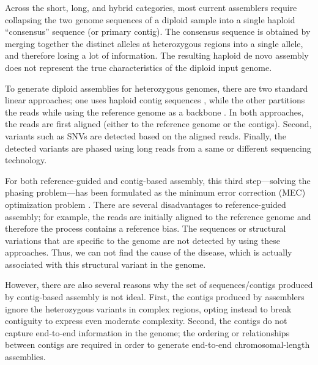 Across the short, long, and hybrid categories, most current assemblers \citep{sohn2016present, simpson2015theory} require collapsing the two genome sequences of a diploid sample into a single haploid ``consensus'' sequence (or primary contig). 
The consensus sequence is obtained by merging together the distinct alleles at heterozygous regions into a single allele, and therefore losing a lot of information.
The resulting haploid de novo assembly does not represent the true characteristics of the diploid input genome. 

To generate diploid assemblies for heterozygous genomes, there are two standard linear approaches; 
one uses haploid contig sequences \citep{chin2016phased, pendleton2015assembly, seo2016novo, mostovoy2016hybrid}, 
while the other partitions the reads while using the reference genome as a backbone \citep{Glusman2014, martin2016whatshap, chaisson2017multi}.
In both approaches, the reads are first aligned (either to the reference genome or the contigs). Second, variants such as SNVs are detected based on the aligned reads. 
Finally, the detected variants are phased using long reads from a same or different sequencing technology.

For both reference-guided and contig-based assembly, this third step---solving the phasing problem---has been formulated as the minimum error correction (MEC) optimization problem \citep{lippert2002algorithmic,Cilibrasi2007}.
There are several disadvantages to reference-guided assembly; for example, the reads are initially aligned to the reference genome and therefore the process contains a reference bias. 
The sequences or structural variations that are specific to the genome are not detected by using these approaches. 
Thus, we can not find the cause of the disease, which is actually associated with this structural variant in the genome.

However, there are also several reasons why the set of sequences/contigs produced by contig-based assembly is not ideal.
First, the contigs produced by assemblers ignore the heterozygous variants in complex regions, opting instead to break contiguity to express even moderate complexity. 
Second, the contigs do not capture end-to-end information in the genome; the ordering or relationships between contigs are required in order to generate end-to-end chromosomal-length assemblies.

